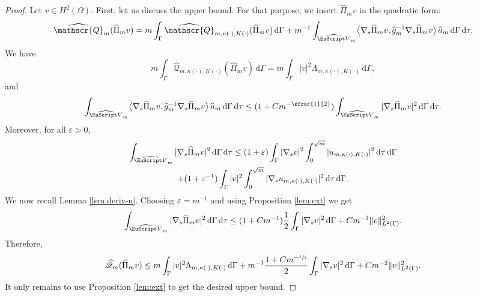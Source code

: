 \documentclass[10pt]{amsart}
\let\mathcal \EuScript
\newcommand{\scrQ}{\mathscr{Q}}
\theoremstyle{plain}
\theoremstyle{definition}
\newcommand{\dx}{\mathrm{\,d}}
\begin{document}
\begin{proof}
Let $v\in H^{2}(\Omega)$. First, let us discuss the upper bound. For that purpose, we insert $\widehat{\Pi}_m v$ in the quadratic form:
\begin{equation*}
\widehat{\scrQ}_{m} (\widehat{\Pi}_m v )=
m\int_\Gamma
\widehat{\scrQ}_{m,\kappa(\cdot),K(\cdot)}(\widehat{\Pi}_m v )\dx
\Gamma
+m^{-1}\int_{\widehat{\mathcal V}_{m}}\bigl\langle\nabla_{s} \widehat{\Pi}_m v,\widehat g^{-1}_m\nabla_{s} \widehat{\Pi}_m v \bigr\rangle\,\widehat a_m \dx \Gamma \dx\tau.
\end{equation*}
We have
\[
m\int_\Gamma \widehat{\scrQ}_{m,\kappa(\cdot),K(\cdot)}(\widehat{\Pi}_m v )\dx\Gamma
= m\int_\Gamma |v|^2\Lambda_{m,\kappa(\cdot),K(\cdot)}\dx\Gamma,
\]
and
\[\int_{\widehat{\mathcal V}_{m}} \bigl\langle\nabla_{s} \widehat{\Pi}_m v,\widehat g^{-1}_m\nabla_{s} \widehat{\Pi}_m v \bigr\rangle\,\widehat a_m \dx \Gamma \dx\tau
\leq (1+Cm^{-\sfrac{1}{2}})\int_{\widehat{\mathcal V}_{m}}|\nabla_{s} \widehat{\Pi}_m v|^2 \dx \Gamma \dx\tau.
\]
Moreover, for all $\varepsilon>0$,
\begin{multline*}
\int_{\widehat{\mathcal V}_{m}}|\nabla_{s} \widehat{\Pi}_m v|^2 \dx \Gamma \dx\tau
\leq(1+\varepsilon)\int_\Gamma
|\nabla_s v|^2
\int_0^{\sqrt{m}}
|u_{m,\kappa(\cdot),K(\cdot)}|^2
\dx\tau
\dx\Gamma\\
+(1+\varepsilon^{-1})\int_{\Gamma}|v|^2\int_0^{\sqrt{m}}|\nabla_{s} u_{m,\kappa(\cdot),K(\cdot)}|^2\dx\tau\dx\Gamma.
\end{multline*}
We now recall Lemma \ref{lem.deriv-u}. Choosing $\varepsilon=m^{-1}$ and using Proposition \ref{lem:ext} we get
\[\int_{\widehat{\mathcal V}_{m}}|\nabla_{s} \widehat{\Pi}_m v|^2 \dx \Gamma \dx\tau\leq (1+Cm^{-1})\frac{1}{2}\int_{\Gamma}|\nabla_{s} v|^2\dx\Gamma+Cm^{-1}\|v\|^2_{L^2(\Gamma)}.\]
Therefore,
\[
\widehat{\scrQ}_{m} (\widehat{\Pi}_m v )\leq m\int_\Gamma |v|^2\Lambda_{m,\kappa(\cdot),K(\cdot)}\dx\Gamma+m^{-1}\frac{1+Cm^{-\sfrac{1}{2}}}{2}\int_{\Gamma}|\nabla_{s} v|^2\dx\Gamma+Cm^{-2}\|v\|^2_{L^2(\Gamma)}.
\]
It only remains to use Proposition \ref{lem:ext} to get the desired upper bound.


\end{proof}
\end{document}
